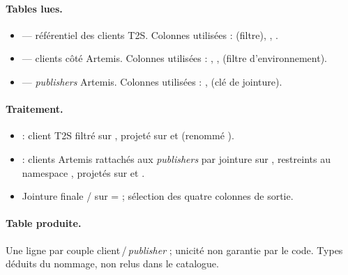 \paragraph{Tables lues.}
\begin{itemize}[nosep,leftmargin=*]
  \item {} --- référentiel des
        clients T2S. Colonnes utilisées :  (filtre),
        , .
  \item {}
        --- clients côté Artemis. Colonnes utilisées : ,
        ,  (filtre d'environnement).
  \item {}
        --- \emph{publishers} Artemis. Colonnes utilisées : ,
         (clé de jointure).
\end{itemize}

\paragraph{Traitement.}
\begin{itemize}[nosep,leftmargin=*]
  \item {} : client T2S filtré sur , projeté sur
         et  (renommé ).
  \item {} : clients Artemis rattachés aux \emph{publishers} par
        jointure  sur , restreints au
        namespace , projetés sur  et
        .
  \item Jointure finale  / sur
         =  ; sélection des quatre colonnes de
        sortie.
\end{itemize}

\paragraph{Table produite.}
Une ligne par couple client\,/\,\emph{publisher} ; unicité non garantie par le code.
Types déduits du nommage, non relus dans le catalogue.

